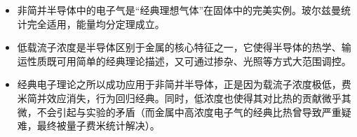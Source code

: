 \begin{insightbox}[物理图像]
\begin{itemize}
    \item 非简并半导体中的电子气是``经典理想气体''在固体中的完美实例。玻尔兹曼统计完全适用，能量均分定理成立。
    \item 低载流子浓度是半导体区别于金属的核心特征之一，它使得半导体的热学、输运性质既可用简单的经典理论描述，又可通过掺杂、光照等方式大范围调控。
    \item 经典电子理论之所以成功应用于非简并半导体，正是因为载流子浓度极低，费米简并效应消失，行为回归经典。同时，低浓度也使得其对比热的贡献微乎其微，不会引起与实验的矛盾（而金属中高浓度电子气的经典比热曾导致严重疑难，最终被量子费米统计解决）。
\end{itemize}
\end{insightbox}
